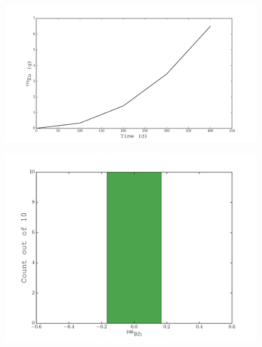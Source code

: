 \documentclass{beamer}
\begin{document}
\begin{frame}
    \begin{figure}[H]
    \begin{center}
      \includegraphics[width=0.77\columnwidth]{../Origen2/PLOTS/EU154Post_XY.pdf}
      \vspace{-5mm}
      \label{fig:POSTXYEu154}
    \end{center}
  \end{figure}
\end{frame}
    
\begin{frame}
  \begin{figure}[H]
    \begin{center}
      \includegraphics[width=0.77\columnwidth]{../Origen2/PLOTS/RH106Post_HIST.pdf}
      \vspace{-5mm}
      \label{fig:POSTHISTRh106}
    \end{center}
  \end{figure}
\end{frame}
  
\end{document}
